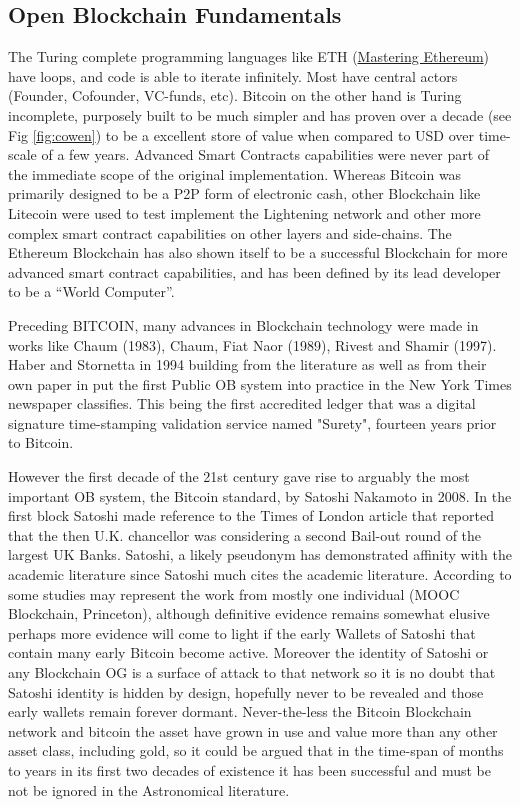 \documentclass[final,5p,times,twocolumn,authoryear]{elsarticle}
\begin{document}
\subsection{Open Blockchain Fundamentals}
\label{subsec:fundamentals}

The Turing complete programming languages like ETH (\href{https://github.com/ethereumbook/ethereumbook#readme}{Mastering Ethereum}) have loops, and code is able to iterate infinitely. Most have central actors (Founder, Cofounder, VC-funds, etc). Bitcoin on the other hand is Turing incomplete, purposely built to be much simpler and has proven over a decade (see Fig \ref{fig:cowen}) to be a excellent store of value when compared to USD over time-scale of a few years. Advanced Smart Contracts capabilities were never part of the immediate scope of the original implementation. Whereas Bitcoin was primarily designed to be a P2P form of electronic cash, other Blockchain like Litecoin were used to test implement the Lightening network and other more complex smart contract capabilities on other layers and side-chains. The Ethereum Blockchain has also shown itself to be a successful Blockchain for more advanced smart contract capabilities, and has been defined by its lead developer to be a “World Computer”. 
 

Preceding BITCOIN, many advances in Blockchain technology were made in works like Chaum (1983), Chaum, Fiat Naor (1989), Rivest and Shamir (1997). Haber and Stornetta in 1994 building from the literature as well as from their own paper in \cite{Haber1991wi} put the first Public OB system into practice in the New York Times newspaper classifies. This being the first accredited ledger that was a digital signature time-stamping validation service named "Surety", fourteen years prior to Bitcoin. 

However the first decade of the 21st century gave rise to arguably the most important OB system, the Bitcoin standard, by Satoshi Nakamoto in 2008.  In the first block Satoshi made reference to the Times of London article that reported that the then U.K. chancellor was considering a second Bail-out round of the largest UK Banks. Satoshi, a likely pseudonym has demonstrated affinity with the academic literature since Satoshi much cites the academic literature. According to some studies may represent the work from mostly one individual (MOOC Blockchain, Princeton), although definitive evidence remains somewhat elusive perhaps more evidence will come to light if the early Wallets of Satoshi that contain many early Bitcoin become active. Moreover the identity of Satoshi or any Blockchain OG is a surface of attack to that network so it is no doubt that Satoshi identity is hidden by design, hopefully never to be revealed and those early wallets remain forever dormant. Never-the-less the Bitcoin Blockchain network and bitcoin the asset have grown in use and value more than any other asset class, including gold, so it could be argued that in the time-span of months to years in its first two decades of existence it has been successful and must be not be ignored in the Astronomical literature.
\end{document}
